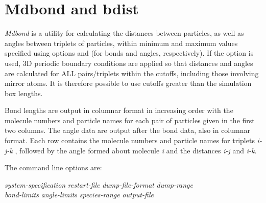 \documentclass[a4paper,twoside]{report}
\begin{document}
\section{Mdbond and bdist}%

\emph{Mdbond} is a utility for calculating the distances between particles,
 as well as angles between triplets of particles,
 within minimum and maximum values specified using options
 and  (for bonds and angles, respectively). If the 
option is used, 3D periodic boundary conditions are applied so that
distances and angles are calculated for ALL pairs/triplets within the cutoffs,
including those involving mirror atoms. It is therefore possible to use cutoffs
greater than the simulation box lengths.
        
Bond lengths are output in columnar format in increasing order with
the molecule numbers and particle names for each pair of particles given in the
first two columns. The angle data are output after the bond data, also
in columnar format. Each row contains the molecule numbers and particle names
for triplets \emph{i-j-k} , followed by the angle formed about
molecule \emph{i} and the distances \emph{i-j} and \emph{i-k}.

The command line options are:

\begin{center}
\Lit{[-s} \textit{system-specification} \Lit{|}
 \textit{restart-file}\Lit{]}
\Lit{[-d} \textit{dump-file-format}\Lit{]}
\Lit{[-t} \textit{dump-range}\Lit{]} \\
\Lit{[-b} \textit{bond-limits}\Lit{]} 
\Lit{[-a} \textit{angle-limits}\Lit{]} 
\Lit{[-g} \textit{species-range}\Lit{]} 
\Lit{[-p]} 
\Lit{[-x]}
\Lit{[-j]}
\Lit{[-c]}
\Lit{[-o} \textit{output-file}\Lit{]}
\end{center}
\end{document}
